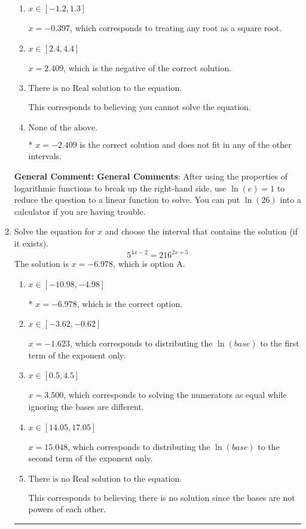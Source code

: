 \documentclass{extbook}[14pt]
\newcommand{\litem}[1]{\item #1

\rule{\textwidth}{0.4pt}}
\begin{document}
\begin{enumerate}
{\begin{enumerate}[label=\Alph*.]
$x = -22.282$, which corresponds to thinking you don't need to take the natural log of both sides before reducing, as if the right side already has a natural log.
\item \( x \in [-1.2, 1.3] \)

$x = -0.397$, which corresponds to treating any root as a square root.
\item \( x \in [2.4, 4.4] \)

$x = 2.409$, which is the negative of the correct solution.
\item \( \text{There is no Real solution to the equation.} \)

This corresponds to believing you cannot solve the equation.
\item \( \text{None of the above.} \)

* $x = -2.409$ is the correct solution and does not fit in any of the other intervals.
\end{enumerate}

\textbf{General Comment:} \textbf{General Comments}: After using the properties of logarithmic functions to break up the right-hand side, use $\ln(e) = 1$ to reduce the question to a linear function to solve. You can put $\ln(26)$ into a calculator if you are having trouble.
}
\litem{
Solve the equation for $x$ and choose the interval that contains the solution (if it exists).
\[ 5^{4x-2} = 216^{2x+5} \]The solution is \( x = -6.978 \), which is option A.\begin{enumerate}[label=\Alph*.]
\item \( x \in [-10.98, -4.98] \)

* $x = -6.978$, which is the correct option.
\item \( x \in [-3.62, -0.62] \)

$x = -1.623$, which corresponds to distributing the $\ln(base)$ to the first term of the exponent only.
\item \( x \in [0.5, 4.5] \)

$x = 3.500$, which corresponds to solving the numerators as equal while ignoring the bases are different.
\item \( x \in [14.05, 17.05] \)

$x = 15.048$, which corresponds to distributing the $\ln(base)$ to the second term of the exponent only.
\item \( \text{There is no Real solution to the equation.} \)

This corresponds to believing there is no solution since the bases are not powers of each other.
\end{enumerate}

}
\end{enumerate}
\end{document}
